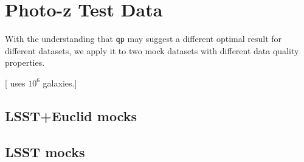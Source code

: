 \documentclass[\docopts]{\docclass}
\begin{document}
\section{Photo-z Test Data}
\label{sec:data}

With the understanding that \texttt{qp} may suggest a different optimal result for different datasets, we apply it to two mock datasets with different data quality properties.

[\citet{carrasco_kind_sparse_2014} uses $10^{6}$ galaxies.]

\subsection{LSST+Euclid mocks}
\label{sec:mg}

\subsection{LSST mocks}
\label{sec:ss}









\end{document}
